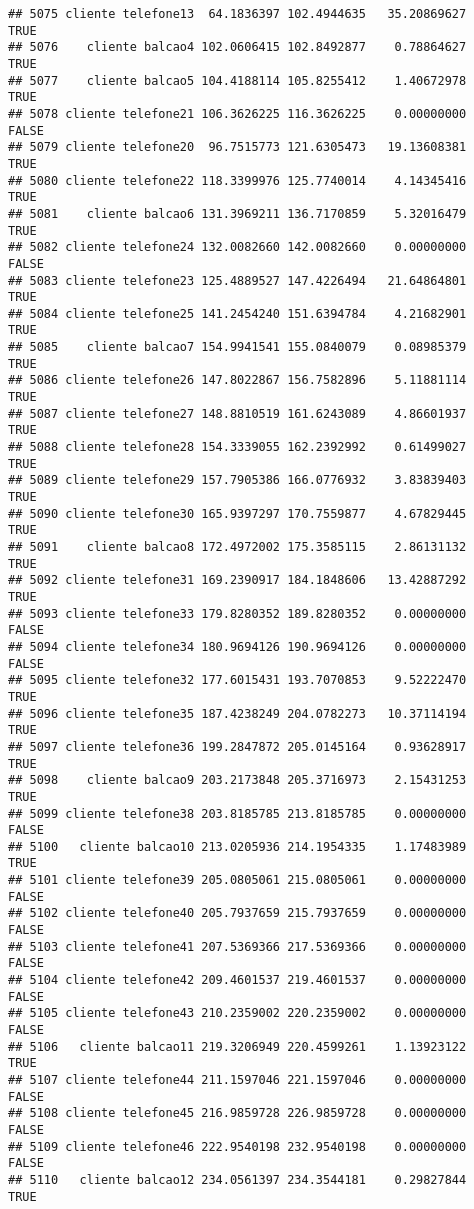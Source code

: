 \documentclass[
]{article}
\begin{document}
\begin{verbatim}
## 5075 cliente telefone13  64.1836397 102.4944635   35.20869627     TRUE
## 5076    cliente balcao4 102.0606415 102.8492877    0.78864627     TRUE
## 5077    cliente balcao5 104.4188114 105.8255412    1.40672978     TRUE
## 5078 cliente telefone21 106.3626225 116.3626225    0.00000000    FALSE
## 5079 cliente telefone20  96.7515773 121.6305473   19.13608381     TRUE
## 5080 cliente telefone22 118.3399976 125.7740014    4.14345416     TRUE
## 5081    cliente balcao6 131.3969211 136.7170859    5.32016479     TRUE
## 5082 cliente telefone24 132.0082660 142.0082660    0.00000000    FALSE
## 5083 cliente telefone23 125.4889527 147.4226494   21.64864801     TRUE
## 5084 cliente telefone25 141.2454240 151.6394784    4.21682901     TRUE
## 5085    cliente balcao7 154.9941541 155.0840079    0.08985379     TRUE
## 5086 cliente telefone26 147.8022867 156.7582896    5.11881114     TRUE
## 5087 cliente telefone27 148.8810519 161.6243089    4.86601937     TRUE
## 5088 cliente telefone28 154.3339055 162.2392992    0.61499027     TRUE
## 5089 cliente telefone29 157.7905386 166.0776932    3.83839403     TRUE
## 5090 cliente telefone30 165.9397297 170.7559877    4.67829445     TRUE
## 5091    cliente balcao8 172.4972002 175.3585115    2.86131132     TRUE
## 5092 cliente telefone31 169.2390917 184.1848606   13.42887292     TRUE
## 5093 cliente telefone33 179.8280352 189.8280352    0.00000000    FALSE
## 5094 cliente telefone34 180.9694126 190.9694126    0.00000000    FALSE
## 5095 cliente telefone32 177.6015431 193.7070853    9.52222470     TRUE
## 5096 cliente telefone35 187.4238249 204.0782273   10.37114194     TRUE
## 5097 cliente telefone36 199.2847872 205.0145164    0.93628917     TRUE
## 5098    cliente balcao9 203.2173848 205.3716973    2.15431253     TRUE
## 5099 cliente telefone38 203.8185785 213.8185785    0.00000000    FALSE
## 5100   cliente balcao10 213.0205936 214.1954335    1.17483989     TRUE
## 5101 cliente telefone39 205.0805061 215.0805061    0.00000000    FALSE
## 5102 cliente telefone40 205.7937659 215.7937659    0.00000000    FALSE
## 5103 cliente telefone41 207.5369366 217.5369366    0.00000000    FALSE
## 5104 cliente telefone42 209.4601537 219.4601537    0.00000000    FALSE
## 5105 cliente telefone43 210.2359002 220.2359002    0.00000000    FALSE
## 5106   cliente balcao11 219.3206949 220.4599261    1.13923122     TRUE
## 5107 cliente telefone44 211.1597046 221.1597046    0.00000000    FALSE
## 5108 cliente telefone45 216.9859728 226.9859728    0.00000000    FALSE
## 5109 cliente telefone46 222.9540198 232.9540198    0.00000000    FALSE
## 5110   cliente balcao12 234.0561397 234.3544181    0.29827844     TRUE

\end{verbatim}
\end{document}
